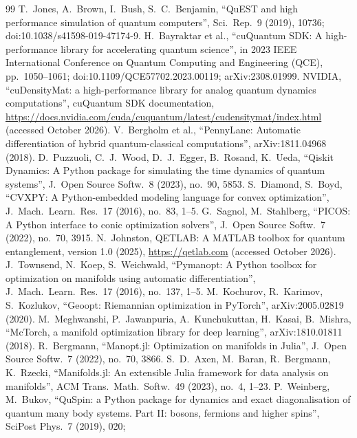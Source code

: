 \documentclass[11pt]{article}
\begin{document}
{\begin{thebibliography}{99}
 T.~Jones, A.~Brown, I.~Bush, S.~C.~Benjamin, ``QuEST and high performance simulation of quantum
  computers'', Sci.\ Rep.\ 9 (2019), 10736; doi:10.1038/s41598-019-47174-9.
 H.~Bayraktar et al., ``cuQuantum SDK: A high-performance library for accelerating quantum
  science'', in 2023 IEEE International Conference on Quantum Computing and Engineering (QCE), pp.~1050--1061;
  doi:10.1109/QCE57702.2023.00119; arXiv:2308.01999.
 NVIDIA, ``cuDensityMat: a high-performance library for analog quantum dynamics computations'',
  cuQuantum SDK documentation, \url{https://docs.nvidia.com/cuda/cuquantum/latest/cudensitymat/index.html} (accessed
  October 2026).
 V.~Bergholm et al., ``PennyLane: Automatic differentiation of hybrid quantum-classical
  computations'', arXiv:1811.04968 (2018).
 D.~Puzzuoli, C.~J.~Wood, D.~J.~Egger, B.~Rosand, K.~Ueda, ``Qiskit Dynamics: A Python package
  for simulating the time dynamics of quantum systems'', J.\ Open Source Softw.\ 8 (2023), no.~90, 5853.
 S.~Diamond, S.~Boyd, ``CVXPY: A Python-embedded modeling language for convex optimization'',
  J.\ Mach.\ Learn.\ Res.\ 17 (2016), no.~83, 1--5.
 G.~Sagnol, M.~Stahlberg, ``PICOS: A Python interface to conic optimization solvers'', J.\ Open
  Source Softw.\ 7 (2022), no.~70, 3915.
 N.~Johnston, QETLAB: A MATLAB toolbox for quantum entanglement, version 1.0 (2025),
  \url{https://qetlab.com} (accessed October 2026).
 J.~Townsend, N.~Koep, S.~Weichwald, ``Pymanopt: A Python toolbox for optimization on manifolds
  using automatic differentiation'', J.\ Mach.\ Learn.\ Res.\ 17 (2016), no.~137, 1--5.
 M.~Kochurov, R.~Karimov, S.~Kozlukov, ``Geoopt: Riemannian optimization in PyTorch'',
  arXiv:2005.02819 (2020).
 M.~Meghwanshi, P.~Jawanpuria, A.~Kunchukuttan, H.~Kasai, B.~Mishra, ``McTorch, a manifold
  optimization library for deep learning'', arXiv:1810.01811 (2018).
 R.~Bergmann, ``Manopt.jl: Optimization on manifolds in Julia'', J.\ Open Source Softw.\ 7
  (2022), no.~70, 3866.
 S.~D.~Axen, M.~Baran, R.~Bergmann, K.~Rzecki, ``Manifolds.jl: An extensible Julia framework for
  data analysis on manifolds'', ACM Trans.\ Math.\ Softw.\ 49 (2023), no.~4, 1--23.
 P.~Weinberg, M.~Bukov, ``QuSpin: a Python package for dynamics and exact diagonalisation of
  quantum many body systems. Part II: bosons, fermions and higher spins'', SciPost Phys.\ 7 (2019), 020;

\end{thebibliography}}
\end{document}
